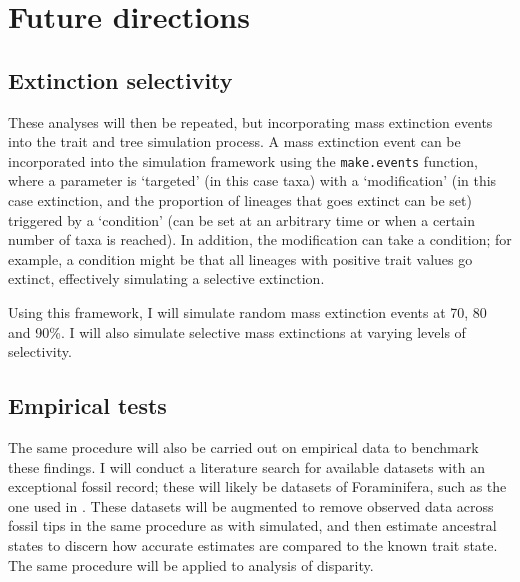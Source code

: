 \documentclass[titlepage]{article}
\begin{document}
\section{Future directions}
\subsection{Extinction selectivity}
These analyses will then be repeated, but incorporating mass extinction events into the trait and tree simulation process.
A mass extinction event can be incorporated into the simulation framework using the \texttt{make.events} function, where a parameter is `targeted' (in this case taxa) with a `modification' (in this case extinction, and the proportion of lineages that goes extinct can be set) triggered by a `condition' (can be set at an arbitrary time or when a certain number of taxa is reached).
In addition, the modification can take a condition; for example, a condition might be that all lineages with positive trait values go extinct, effectively simulating a selective extinction.

Using this framework, I will simulate random mass extinction events at 70, 80 and 90\%.
I will also simulate selective mass extinctions at varying levels of selectivity.

\subsection{Empirical tests}
The same procedure will also be carried out on empirical data to benchmark these findings.
I will conduct a literature search for available datasets with an exceptional fossil record; these will likely be datasets of Foraminifera, such as the one used in \cite{webster2002testing}.
These datasets will be augmented to remove observed data across fossil tips in the same procedure as with simulated, and then estimate ancestral states to discern how accurate estimates are compared to the known trait state.
The same procedure will be applied to analysis of disparity. 
\end{document}
